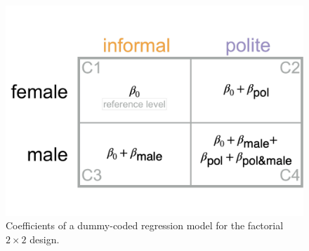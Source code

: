 \documentclass[nobib]{tufte-handout}
\begin{document}
\begin{figure}[]
  \centering
    \includegraphics[width = \textwidth]{pics/table_coefficients.pdf}
    \caption{Coefficients of a dummy-coded regression model for the factorial $2 \times 2$ design.}
    \label{fig:coefficients_table}
\end{figure}
\end{document}
